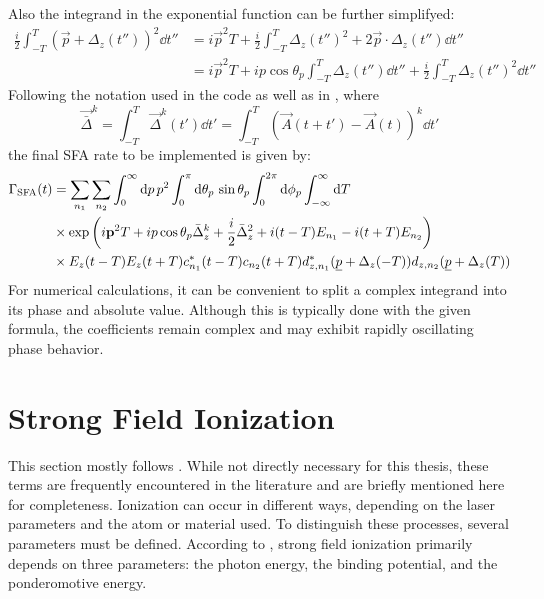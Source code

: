 Also the integrand in the exponential function can be further simplifyed:
\begin{align*}
    \frac{i}{2}\int_{-T}^{T}(\vec{p}+\Delta_z(t''))^2\dd t'' &= i\vec{p}^2T + \frac{i}{2}\int_{-T}^{T}\Delta_z(t'')^2+2\vec{p}\cdot\Delta_z(t'')\dd t'' \\
    &= i\vec{p}^2T + ip\cos\theta_p\int_{-T}^{T}\Delta_z(t'')\dd t'' +  \frac{i}{2}\int_{-T}^{T}\Delta_z(t'')^2\dd t''
\end{align*}
Following the notation used in the code as well as in \cite{Theory_NPS}, where
\begin{equation*}
    \vec{\bar{\Delta}}^k = \int_{-T}^{T}\vec{\Delta}^k(t')\dd t' = \int_{-T}^{T}\left(\vec{A}(t+t') - \vec{A}(t)\right)^k\dd t'
\end{equation*}
the final SFA rate to be implemented is given by:
\begin{align*}
    \Gamma_{\mathrm{SFA}}(t) &= \sum_{n_1}\sum_{n_2} \int_0^{\infty} \mathrm{d} p\,p^2\int_0^{\pi} \mathrm{d}\theta_p\,\sin\theta_p \int_0^{2\pi}\mathrm{d} \phi_p\int_{-\infty}^{\infty} \mathrm{d} T\\
    &\times \exp\left(i\mathbf{p}^2T + ip\cos\theta_p\bar{\Delta}_z^k +  \frac{i}{2}\bar{\Delta}_z^2  + i(t-T)E_{n_1}-i(t+T)E_{n_2}\right)\\
    &\times E_z(t-T) E_z(t+T)c_{n_1}^*(t-T)c_{n_2}(t+T) d_{z,n_1}^*(\underline{p}+\Delta_z(-T))d_{z,n_2}(\underline{p}+\Delta_z(T))
\end{align*}
For numerical calculations, it can be convenient to split a complex integrand into its phase and absolute value.
Although this is typically done with the given formula, the coefficients remain complex and may exhibit rapidly oscillating phase behavior.







\section{Strong Field Ionization}
This section mostly follows \cite{manorammasterthesis}.
While not directly necessary for this thesis, these terms are frequently encountered in the literature and are briefly mentioned here for completeness.
Ionization can occur in different ways, depending on the laser parameters and the atom or material used.
To distinguish these processes, several parameters must be defined.
According to \cite{Keldysh:1965ojf}, strong field ionization primarily depends on three parameters: the photon energy, the binding potential, and the ponderomotive energy.

